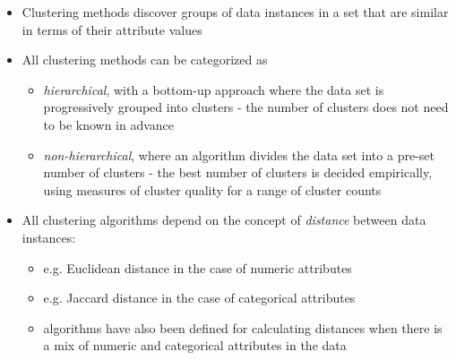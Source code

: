 \newpage



\begin{itemize}
\item Clustering methods discover groups of data instances in a set that are similar in terms of their attribute values
\item All clustering methods can be categorized as
  \begin{itemize}
  \item \emph{hierarchical}, with a bottom-up approach where the data set is progressively grouped into clusters - the number of clusters does not need to be known in advance 
  \item \emph{non-hierarchical}, where an algorithm divides the data set  into a pre-set  number of clusters - the best number of clusters is decided empirically, using measures of cluster quality for a range of cluster counts
  \end{itemize}
\item All clustering algorithms depend on the concept of \emph{distance} between data instances:
  \begin{itemize}
  \item e.g. Euclidean distance in the case of numeric attributes
  \item e.g. Jaccard distance in the case of categorical attributes
    \item algorithms have also been defined for calculating distances when there is a mix of numeric and categorical attributes in the data
  \end{itemize}
\end{itemize}
\newpage

